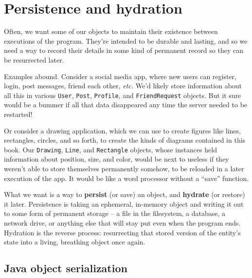 

\chapter{Persistence and hydration}

Often, we want some of our objects to maintain their existence between
executions of the program. They're intended to be durable and lasting, and so
we need a way to record their details in some kind of permanent record so they
can be resurrected later.

Examples abound. Consider a social media app, where new users can register,
login, post messages, friend each other, \textit{etc.} We'd likely store
information about all this in various \texttt{User}, \texttt{Post},
\texttt{Profile}, and \texttt{FriendRequest} objects. But it sure would be a
bummer if all that data disappeared any time the server needed to be
restarted!

Or consider a drawing application, which we can use to create figures like
lines, rectangles, circles, and so forth, to create the kinds of diagrams
contained in this book. Our \texttt{Drawing}, \texttt{Line}, and
\texttt{Rectangle} objects, whose instances held information about position,
size, and color, would be next to useless if they weren't able to store
themselves permanently somehow, to be reloaded in a later execution of the
app. It would be like a word processor without a ``save'' function.

What we want is a way to \textbf{persist} (or save) an object, and
\textbf{hydrate} (or restore) it later. Persistence is taking an ephemeral,
in-memory object and writing it out to some form of permanent storage -- a
file in the filesystem, a database, a network drive, or anything else that
will stay put even when the program ends. Hydration is the reverse process:
resurrecting that stored version of the entity's state into a living,
breathing object once again.

\section{Java object serialization}

